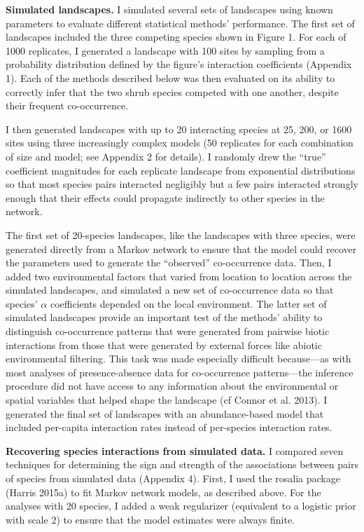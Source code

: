\documentclass[12pt,]{article}
\begin{document}
\begin{spacing}{1.9}
\begin{flushleft}
\noindent \textbf{Simulated landscapes.} I simulated several sets of
landscapes using known parameters to evaluate different statistical
methods' performance. The first set of landscapes included the three
competing species shown in Figure 1. For each of 1000 replicates, I
generated a landscape with 100 sites by sampling from a probability
distribution defined by the figure's interaction coefficients (Appendix
1). Each of the methods described below was then evaluated on its
ability to correctly infer that the two shrub species competed with one
another, despite their frequent co-occurrence.

I then generated landscapes with up to 20 interacting species at 25,
200, or 1600 sites using three increasingly complex models (50
replicates for each combination of size and model; see Appendix 2 for
details). I randomly drew the ``true'' coefficient magnitudes for each
replicate landscape from exponential distributions so that most species
pairs interacted negligibly but a few pairs interacted strongly enough
that their effects could propagate indirectly to other species in the
network.

The first set of 20-species landscapes, like the landscapes with three
species, were generated directly from a Markov network to ensure that
the model could recover the parameters used to generate the ``observed''
co-occurrence data. Then, I added two environmental factors that varied
from location to location across the simulated landscapes, and simulated
a new set of co-occurrence data so that species' \(\alpha\) coefficients
depended on the local environment. The latter set of simulated
landscapes provide an important test of the methods' ability to
distinguish co-occurrence patterns that were generated from pairwise
biotic interactions from those that were generated by external forces
like abiotic environmental filtering. This task was made especially
difficult because---as with most analyses of presence-absence data for
co-occurrence patterns---the inference procedure did not have access to
any information about the environmental or spatial variables that helped
shape the landscape (cf Connor et al. 2013). I generated the final set
of landscapes with an abundance-based model that included per-capita
interaction rates instead of per-species interaction rates.

\noindent \textbf{Recovering species interactions from simulated data.}
I compared seven techniques for determining the sign and strength of the
associations between pairs of species from simulated data (Appendix 4).
First, I used the rosalia package (Harris 2015a) to fit Markov network
models, as described above. For the analyses with 20 species, I added a
weak regularizer (equivalent to a logistic prior with scale 2) to ensure
that the model estimates were always finite.


\end{flushleft}
\end{spacing}
\end{document}

